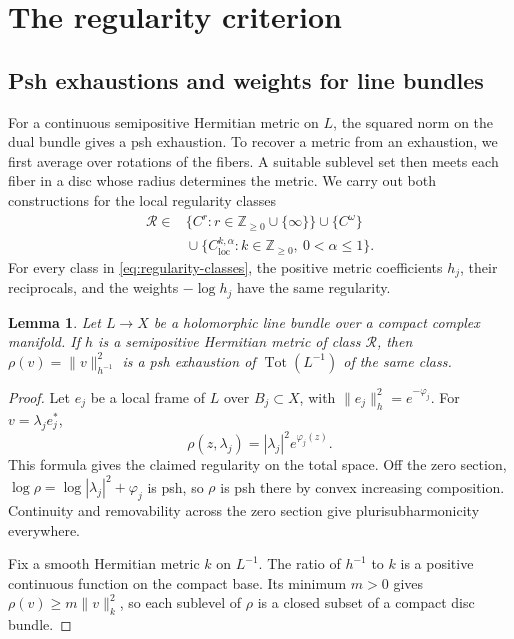 \documentclass[11pt]{amsart}
\newtheorem{lemma}[theorem]{Lemma}
\theoremstyle{definition}
\theoremstyle{remark}
\numberwithin{equation}{section}
\newcommand{\Tot}{\operatorname{Tot}}
\begin{document}
\section{The regularity criterion}\label{sec:radius}
\subsection{Psh exhaustions and weights for line bundles}\label{subsec:line-bundle-weights}
For a continuous semipositive Hermitian metric on $L$,
the squared norm on the dual bundle gives a psh exhaustion. To recover a metric from an
exhaustion, we first average over rotations of the fibers. A suitable
sublevel set then meets each fiber in a disc whose radius determines
the metric. We carry out both constructions for the local regularity
classes
\begin{equation}\label{eq:regularity-classes}
\begin{split}
 \mathcal R\in{}&\{C^r:r\in\mathbb Z_{\ge0}\cup\{\infty\}\}
 \cup\{C^\omega\}\\
 &{}\cup\{C^{k,\alpha}_{\mathrm{loc}}:
          k\in\mathbb Z_{\ge0},\ 0<\alpha\le1\}.
\end{split}
\end{equation}
For every class in \eqref{eq:regularity-classes}, the positive metric
coefficients $h_j$, their reciprocals, and the weights
$-\log h_j$ have the same regularity.

\begin{lemma}\label{lem:norm}
Let $L\to X$ be a holomorphic line bundle over a compact complex
manifold. If $h$ is a semipositive Hermitian metric of class
$\mathcal R$, then $\rho(v)=\|v\|_{h^{-1}}^2$ is a psh exhaustion
of $\Tot(L^{-1})$ of the same class.
\end{lemma}
\begin{proof}
Let $e_j$ be a local frame of $L$ over $B_j\subset X$, with
$\|e_j\|_h^2=e^{-\varphi_j}$. For $v=\lambda_j e_j^*$,
\begin{equation}\label{eq:local-norm}
 \rho(z,\lambda_j)=|\lambda_j|^2e^{\varphi_j(z)}.
\end{equation}
This formula gives the claimed regularity on the total space.
Off the zero section, $\log\rho=\log|\lambda_j|^2+\varphi_j$ is psh,
so $\rho$ is psh there by convex increasing composition.
Continuity and removability across the zero section give
plurisubharmonicity everywhere.

Fix a smooth Hermitian metric $k$ on $L^{-1}$. The ratio of $h^{-1}$
to $k$ is a positive continuous function on the compact base. Its
minimum $m>0$ gives $\rho(v)\ge m\|v\|_k^2$, so each sublevel of
$\rho$ is a closed subset of a compact disc bundle.
\end{proof}
\end{document}
